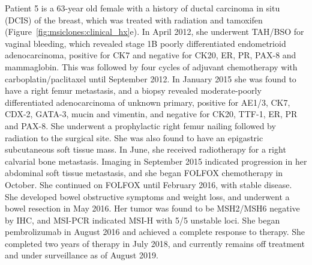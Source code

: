 Patient 5 is a 63-year old female with a history of ductal carcinoma in situ (DCIS) of the breast, which was treated with radiation and tamoxifen (Figure~\ref{fig:msiclones:clinical_hx}e). In April 2012, she underwent TAH/BSO for vaginal bleeding, which revealed stage 1B poorly differentiated endometrioid adenocarcinoma, positive for CK7 and negative for CK20, ER, PR, \mbox{PAX-8} and mammaglobin. This was followed by four cycles of adjuvant chemotherapy with carboplatin\slash{}paclitaxel until September 2012. In January 2015 she was found to have a right femur metastasis, and a biopsy revealed moderate-poorly differentiated adenocarcinoma of unknown primary, positive for AE1/3, CK7, \mbox{CDX-2}, \mbox{GATA-3}, mucin and vimentin, and negative for CK20, \mbox{TTF-1}, ER, PR and \mbox{PAX}-8. She underwent a prophylactic right femur nailing followed by radiation to the surgical site. She was also found to have an epigastric subcutaneous soft tissue mass. In June, she received radiotherapy for a right calvarial bone metastasis. Imaging in September 2015 indicated progression in her abdominal soft tissue metastasis, and she began FOLFOX chemotherapy in October. She continued on FOLFOX until February 2016, with stable disease. She developed bowel obstructive symptoms and weight loss, and underwent a bowel resection in May 2016. Her tumor was found to be MSH2/MSH6 negative by IHC, and MSI-PCR indicated MSI-H with 5/5 unstable loci. She began pembrolizumab in August 2016 and achieved a complete response to therapy. She completed two years of therapy in July 2018, and currently remains off treatment and under surveillance as of August 2019.

